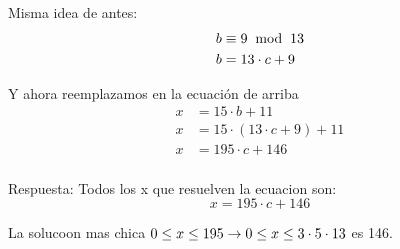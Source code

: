 \documentclass[12pt,a4paper]{report}
\begin{document}
Misma idea de antes:
$$
\begin{aligned}
  b &\equiv  9 \; \bmod \; {{13}} \\
  b &= 13 \cdot c + 9 \\
\end{aligned}
$$

Y ahora reemplazamos en la ecuación de arriba
$$
\begin{aligned}
  x &= 15 \cdot b  + 11 \\
  x &= 15 \cdot (13 \cdot c + 9)  + 11 \\
  x &= 195 \cdot c + 146 \\
\end{aligned}
$$

Respuesta: Todos los x que resuelven la ecuacion son:
$$
  x = 195 \cdot c + 146
$$

La solucoon mas chica $0 \leq x \leq 195 \rightarrow 0 \leq x \leq 3 \cdot 5 \cdot 13$ es 146.






\end{document}
